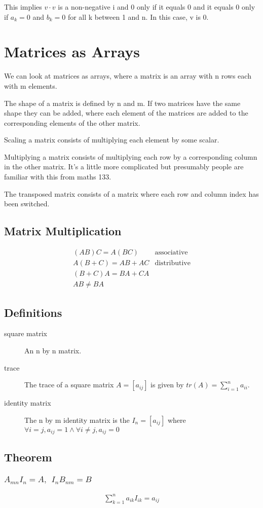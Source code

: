 		This implies $v \cdot v$ is a non-negative i and 0 only if it equals 0 and it equals 0 only if $a_k = 0$ and $b_k = 0$ for all k between 1 and n.
		In this case, v is 0.
		
\section{Matrices as Arrays}

	We can look at matrices as arrays, where a matrix is an array with n rows each with m elements.
	
	The shape of a matrix is defined by n and m.
	If two matrices have the same shape they can be added, where each element of the matrices are added to the corresponding elements of the other matrix.
	
	Scaling a matrix consists of multiplying each element by some scalar.
	
	Multiplying a matrix consists of multiplying each row by a corresponding column in the other matrix.
	It's a little more complicated but presumably people are familiar with this from maths 133.
	
	The transposed matrix consists of a matrix where each row and column index has been switched.
	
	\subsection{Matrix Multiplication}
	
		\begin{align}
			(AB)C = A(BC) & \textrm{associative} \\
			A(B+C) = AB + AC & \textrm{distributive} \\
			(B+C)A = BA + CA \\
			AB \neq BA
		\end{align}
		
	\subsection{Definitions}
	
			\begin{description}
				\item[square matrix] An n by n matrix.
				\item[trace] The trace of a square matrix $A = [a_{ij}]$ is given by $tr(A) = \sum_{i=1}^{n} a_{ii}$.
				\item[identity matrix] The n by m identity matrix is the $I_n = [a_{ij}]$ where $\forall i = j, a_{ij} = 1 \wedge \forall i \neq j, a_{ij} = 0$
			\end{description}
			
	\subsection{Theorem}
		
		\subsubsection{$A_{mn}I_n = A,\ \ I_nB_{nm} = B$}
		
			\begin{align}
				\sum_{k=1}^{n} a_{ik}I_{ik} = a_{ij}
			\end{align}